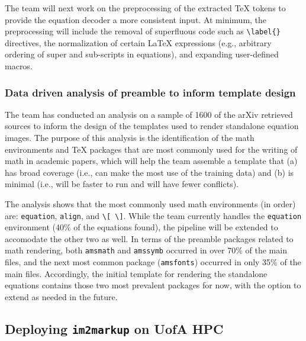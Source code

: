 \documentclass[article, 12pt, oneside]{memoir}
\begin{document}
The team will next work on the preprocessing of the extracted TeX tokens
to provide the equation decoder a more consistent input. At minimum, the
preprocessing will include the removal of superfluous code such as
\texttt{\textbackslash{}label\{\}} directives, the normalization of
certain LaTeX expressions (e.g., arbitrary ordering of super and
sub-scripts in equations), and expanding user-defined macros.

\hypertarget{data-driven-analysis-of-preamble-to-inform-template-design}{%
\subsubsection{Data driven analysis of preamble to inform template
design}\label{data-driven-analysis-of-preamble-to-inform-template-design}}

The team has conducted an analysis on a sample of 1600 of the arXiv
retrieved sources to inform the design of the templates used to render
standalone equation images. The purpose of this analysis is the
identification of the math environments and TeX packages that are most
commonly used for the writing of math in academic papers, which
will help the team assemble a
template that (a) has broad coverage (i.e., can make the most use of the
training data) and (b) is minimal (i.e., will be faster to run and will
have fewer conflicts).

The analysis shows that the most commonly used math environments (in
order) are: \texttt{equation}, \texttt{align}, and
\texttt{\textbackslash{}{[}\ \textbackslash{}{]}}. While the team
currently handles the \texttt{equation} environment (40\% of the
equations found), the pipeline will be extended to accomodate the other
two as well. In terms of the preamble packages related to math
rendering, both \texttt{amsmath} and \texttt{amssymb} occurred in over
70\% of the main files, and the next most common package
(\texttt{amsfonts}) occurred in only 35\% of the main files.
Accordingly, the initial template for rendering the standalone equations
contains those two most prevalent packages for now, with the option to
extend as needed in the future.

\hypertarget{deploying-im2markup-on-uofa-hpc}{%
\subsection{\texorpdfstring{Deploying \texttt{im2markup} on UofA
HPC}{Deploying im2markup on UofA HPC}}\label{deploying-im2markup-on-uofa-hpc}}
\end{document}
